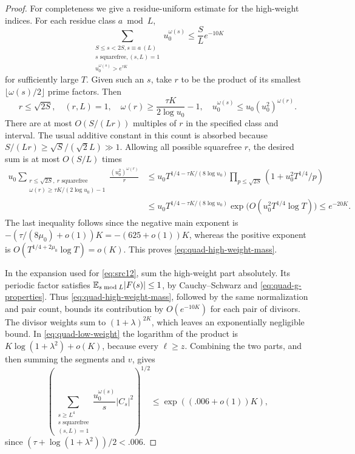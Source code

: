 \begin{proof}
For completeness we give a residue-uniform estimate for the
high-weight indices.  For each residue class $a\bmod L$,
\begin{equation}\label{eq:quad-high-weight-mass}
 \sum_{\substack{S\leq s<2S, s\equiv a\ (L)\\
                  s\text{ squarefree}, (s,L)=1\\
                  u_0^{\omega(s)}>e^{\tau K}}}
                  u_0^{\omega(s)}
 \leq\frac S L e^{-10K}
\end{equation}
for sufficiently large $T$.  Given such an $s$, take $r$ to be the
product of its smallest $\lfloor\omega(s)/2\rfloor$ prime factors.
Then
\[
 r\leq\sqrt{2S},\quad(r,L)=1,\quad
 \omega(r)\geq\frac{\tau K}{2\log u_0}-1,\quad
 u_0^{\omega(s)}\leq u_0(u_0^2)^{\omega(r)}.
\]
There are at most $O(S/(Lr))$ multiples of $r$ in the specified class
and interval.  The usual additive constant in this count is absorbed
because $S/(Lr)\geq\sqrt S/(\sqrt2L)\gg1$.
Allowing all possible squarefree $r$, the desired sum is at most
$O(S/L)$ times
\[
 \begin{aligned}
 u_0\sum_{\substack{r\leq\sqrt{2S},\ r\text{ squarefree}\\
                 \omega(r)\geq\tau K/(2\log u_0)-1}}
       \frac{(u_0^2)^{\omega(r)}}r
 &\leq u_0T^{1/4-\tau K/(8\log u_0)}
        \prod_{p\leq\sqrt{2S}}(1+u_0^2T^{1/4}/p)\\
 &\leq u_0T^{1/4-\tau K/(8\log u_0)}
        \exp\bigl(O(u_0^2T^{1/4}\log T)\bigr)
 \leq e^{-20K}.
 \end{aligned}
\]
The last inequality follows since the negative main exponent is
$-(\tau/(8\mu_0)+o(1))K=-(625+o(1))K$, whereas the positive
exponent is $O(T^{1/4+2\mu_0}\log T)=o(K)$.
This proves \eqref{eq:quad-high-weight-mass}.

In the expansion used for \eqref{eq:src12}, sum the high-weight part
absolutely.  Its periodic factor satisfies
$\mathbb E_{s\bmod L}|F(s)|\leq1$, by Cauchy--Schwarz and
\eqref{eq:quad-g-properties}.  Thus
\eqref{eq:quad-high-weight-mass}, followed by the same normalization
and pair count, bounds its contribution by $O(e^{-10K})$ for each
pair of divisors.  The divisor weights sum to
$(1+\lambda)^{2K}$, which leaves an exponentially negligible bound.
In \eqref{eq:quad-low-weight} the logarithm of the product is
$K\log(1+\lambda^2)+o(K)$, because every $\ell\geq z$.
Combining the two parts, and then summing the segments and $v$, gives
\begin{equation}\label{eq:quad-large-s-norm}
 \left(\sum_{\substack{s\geq L^4\\s\text{ squarefree}\\(s,L)=1}}
             \frac{u_0^{\omega(s)}}s|C_s|^2\right)^{1/2}
 \leq\exp((.006+o(1))K),
\end{equation}
since $(\tau+\log(1+\lambda^2))/2<.006$.


\end{proof}
